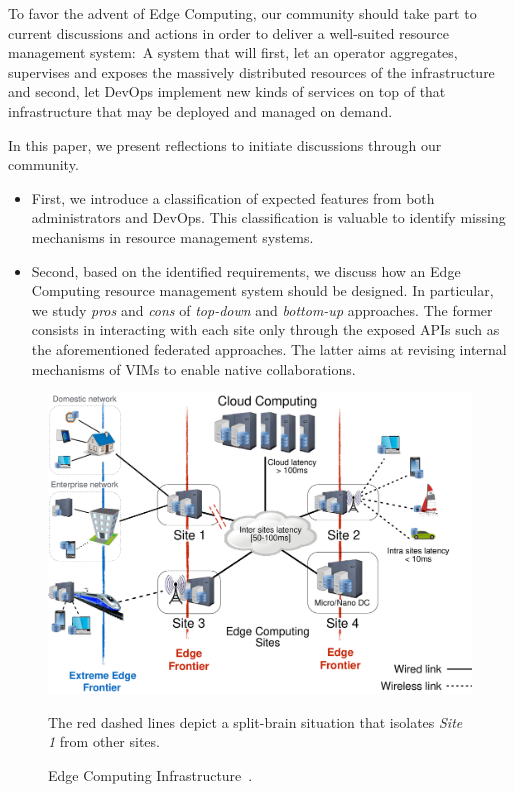 To favor the advent of Edge Computing, our community should take part
to current discussions and actions in order to deliver a well-suited
resource management system:~A system that will first, let an operator
aggregates, supervises and exposes the massively distributed resources
of the infrastructure and second, let DevOps implement new kinds
of services on top of that infrastructure that may be deployed and
managed on demand.


In this paper, we present reflections to initiate discussions through our community.

\begin{itemize}
\item First, we introduce a classification of expected features from
  both administrators and DevOps. This classification is valuable to
  identify missing mechanisms in resource management systems.
\item Second, based on the identified requirements, we discuss
  how an Edge Computing resource management system
  should be designed. In particular, we study \emph{pros} and
  \emph{cons} of \emph{top-down} and \emph{bottom-up} approaches. The
  former consists in interacting with each site only through the
  exposed APIs such as the aforementioned federated approaches. The
  latter aims at revising internal mechanisms of VIMs to enable native
  collaborations.
  \end{itemize}

\begin{figure}[t]
  \centering
  \includegraphics[width=\columnwidth]{./figures/figure_fog.pdf}
  \caption{Edge Computing Infrastructure~\cite{7923796}.}
    {\small The red dashed lines depict a split-brain situation that isolates
    \emph{Site 1} from other sites.}
  \label{fig:fogedge-archi}
\end{figure}

